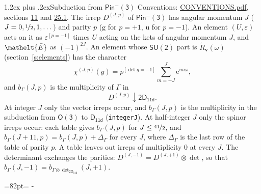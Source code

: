 \documentclass[10pt,a4paper]{article}
\makeatletter
\renewcommand\section{\@startsection{section}{1}{\z@}{-3ex plus -1ex minus -.2ex}%
  {1.2ex plus .2ex}{\normalfont\large\sffamily\bfseries\color{parttitle}}}
\newcommand{\needspace}[1]{\par\penalty-100\begingroup\dimen0=#1\relax\dimen2=\pagegoal
  \advance\dimen2-\pagetotal\ifdim\dimen0>\dimen2\relax\ifdim\dimen2>0pt\vfil\break\fi\fi
  \endgroup}
\numberwithin{equation}{section}
\newcommand{\eltfont}[1]{{\let\sigma\eltsigma\mathelt{#1}}}
\newcommand{\grp}[1]{\mathsf{#1}}
\newcommand{\elt}[1]{\eltfont{#1}}
\newcommand{\ptag}[1]{\mathrm{#1}}
\newcommand{\iverson}[1]{[#1]}
\newcommand{\restr}[2]{#1\!\downarrow#2}
\newcommand{\vv}{\mathbf{v}}
\newcommand{\iunit}{\mathrm{i}}
\newcommand{\expe}{\mathrm{e}}
\newcommand{\irrJp}[2]{D^{(#1,#2)}}
\newcommand{\irrprod}{\otimes}
\newcommand{\barred}[1]{\bar{#1}}
\newcommand{\lift}[1]{\tilde{#1}}
\makeatother
\begin{document}
\section{Subduction from \texorpdfstring{$\grp{Pin^{-}(3)}$}{Pin(3)}}\label{s:subduction_parent}
Conventions: \href{../../CONVENTIONS.pdf}{CONVENTIONS.pdf}, sections \href{../../../rotation/CONVENTIONS.pdf\#conv.11}{11} and \href{../../CONVENTIONS.pdf\#conv.25.1}{25.1}.
\leavevmode\label{n:index.J}\label{n:index.parity}\label{n:irrep.o3}The irrep $\irrJp{J}{p}$ of \href{Pinminus3.pdf}{$\grp{Pin^{-}(3)}$} has angular momentum $J$ ($J = 0, \nicefrac{1}{2}, 1, \dots$) and parity $p$ ($\ptag{g}$ for $p = +1$, $\ptag{u}$ for $p = -1$). An element $(U, \varepsilon)$ acts on it as $\varepsilon^{[p = -1]}$ times $U$ acting on the kets of angular momentum $J$, and $\elt{\barred{E}}$ as $(-1)^{2J}$. \label{n:function.character.parent}\label{n:function.multiplicity}An element whose $\grp{SU(2)}$ part is $\lift{R}_{\vv}(\omega)$ (section~\ref{s:elements}) has the character
\begin{equation}\label{e:chi}\chi^{(J,p)}(g) = p^{\iverson{\det g = -1}}\sum_{m=-J}^{J} \expe^{\iunit m\omega},\end{equation}
and $b_\Gamma(J, p)$ is the multiplicity of $\Gamma$ in
\begin{equation}\label{e:parent}\restr{\irrJp{J}{p}}{\grp{2D_{11d}}}.\end{equation}
At integer $J$ only the vector irreps occur, and $b_\Gamma(J, p)$ is the multiplicity in the subduction from $\grp{O(3)}$ to \href{../../../rotation/data/pdf/D11d.pdf}{$\grp{D_{11d}}$} (\texttt{integerJ}). \label{n:index.increment}At half-integer $J$ only the spinor irreps occur: each table gives $b_\Gamma(J, p)$ for $J \le \nicefrac{41}{2}$, and $b_\Gamma(J + 11, p) = b_\Gamma(J, p) + \Delta_\Gamma$ for every $J$, where $\Delta_\Gamma$ is the last row of the table of parity $p$. A table leaves out irreps of multiplicity 0 at every $J$.
\leavevmode\label{n:operator.determinant.character}The determinant exchanges the parities: $\irrJp{J}{-1} = \irrJp{J}{+1} \irrprod \det$, so that $b_\Gamma(J, -1) = b_{\Gamma \irrprod \det_{\grp{2D_{11d}}}}(J, +1)$.
\needspace{82pt}
\end{document}
